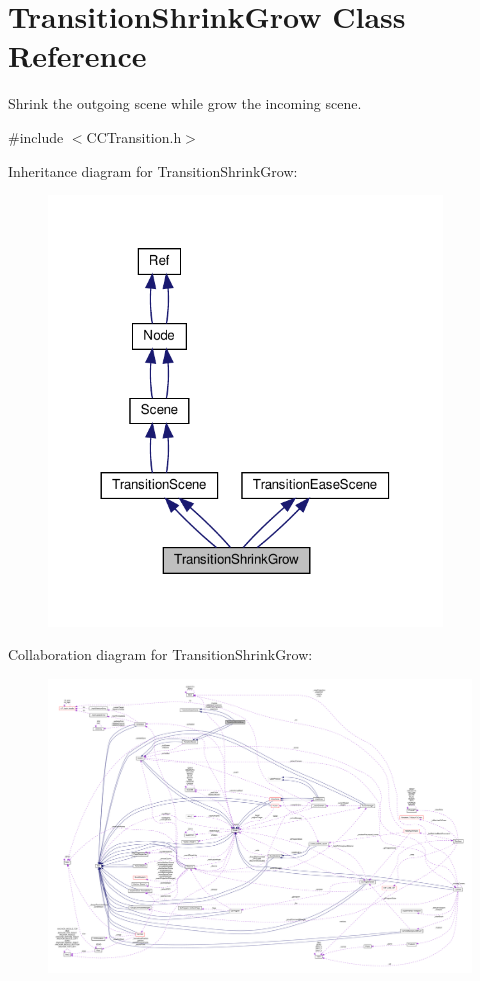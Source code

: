 \hypertarget{classTransitionShrinkGrow}{}\section{Transition\+Shrink\+Grow Class Reference}
\label{classTransitionShrinkGrow}


Shrink the outgoing scene while grow the incoming scene.  




{\ttfamily \#include $<$C\+C\+Transition.\+h$>$}



Inheritance diagram for Transition\+Shrink\+Grow\+:
\nopagebreak
\begin{figure}[H]
\begin{center}
\leavevmode
\includegraphics[width=296pt]{classTransitionShrinkGrow__inherit__graph}
\end{center}
\end{figure}


Collaboration diagram for Transition\+Shrink\+Grow\+:
\nopagebreak
\begin{figure}[H]
\begin{center}
\leavevmode
\includegraphics[width=350pt]{classTransitionShrinkGrow__coll__graph}
\end{center}
\end{figure}
